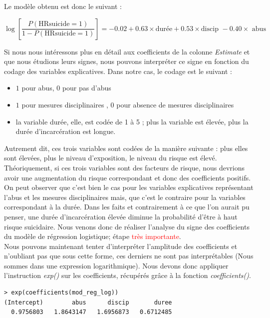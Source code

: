 Le modèle obtenu est donc le suivant : 

$$\log\left[\frac{P(\textrm{HRsuicide} = 1)}{1-P(\textrm{HRsuicide} = 1)}\right] =  -0.02+ 0.63\times\textrm{durée} + 0.53\times\textrm{discip } -0.40 \times\textrm{ abus}$$

Si nous nous intéressons plus en détail aux coefficients de la colonne \textit{Estimate} et que nous étudions leurs signes, nous pouvons interpréter ce signe en fonction du codage des variables explicatives. \newline
Dans notre cas, le codage est le suivant : 
\begin{itemize}
\item $1$ pour abus, $0$ pour pas d'abus
\item $1$ pour mesures disciplinaires , $0$ pour absence de mesures disciplinaires
\item la variable durée, elle, est codée de 1 à 5 ; plus la variable est élevée, plus la durée d'incarcération est longue.
\end{itemize}
Autrement dit, ces trois variables sont codées de la manière suivante : plus elles sont élevées, plus le niveau d'exposition, le niveau du risque est élevé. \newline 
Théoriquement, si ces trois variables sont des facteurs de risque, nous devrions avoir une augmentation du risque correspondant et donc des coefficients positifs.\newline
On peut observer que c'est bien le cas pour les variables explicatives représentant l'abus et les mesures disciplinaires mais, que c'est le contraire pour la variables correspondant à la durée.\newline
Dans les faits et contrairement à ce que l'on aurait pu penser, une durée d'incarcération élevée diminue la probabilité d'être à haut risque suicidaire. 
Nous venons donc de réaliser l'analyse du signe des coefficients du modèle de régression logistique; étape \textcolor{red}{très importante}.\newline
\\
Nous pouvons maintenant tenter d'interpréter l'amplitude des coefficients et n'oubliant pas que sous cette forme, ces derniers ne sont pas interprétables (Nous sommes dans une expression logarithmique). Nous devons donc appliquer l'instruction \textit{exp()} sur les coefficients, récupérés grâce à la fonction \textit{coefficients()}.
\begin{lstlisting}[language=html]
> exp(coefficients(mod_reg_log))
(Intercept)        abus      discip       duree 
  0.9756803   1.8643147   1.6956873   0.6712485 
\end{lstlisting}

